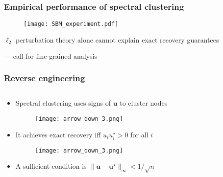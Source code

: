 \documentclass[compress,
mathserif,wide,%
]{beamer}
\begin{document}
\begin{frame}
	\frametitle{Empirical performance of spectral clustering}
	\begin{figure}
	\texttt{[image: SBM\_experiment.pdf]}
	\end{figure}
	
	
	{

\begin{varblock}[\textwidth]{}
\begin{center}
	$\ell_{2}$ perturbation theory alone cannot explain exact recovery guarantees
\end{center}
\end{varblock}
}
\hfill --- call for fine-grained analysis
	\end{frame}
	




\begin{frame}
	\frametitle{Reverse engineering}

\begin{columns}

\begin{column}{0.92\textwidth}
\begin{itemize}
  \item[] Spectral clustering uses signs of $\bm{u}$ to cluster nodes 
  \pause

  \vspace{-1em}
  \begin{figure}
	\texttt{[image: arrow\_down\_3.png]} \qquad 
  \end{figure}

  \item[] It achieves exact recovery iff $u_{i} u_{i}^{\star} > 0$ for all $i$

  \pause
  \vspace{-1em}
  \begin{figure}
	\texttt{[image: arrow\_down\_3.png]} \qquad 
  \end{figure}


  \item[] A sufficient condition is\alertb{$^*$}  $\|\bm{u} - \bm{u}^{\star}\|_{\infty} < 1/\sqrt{n}$

  
\end{itemize}



\end{column}
\end{columns}

\end{frame}
\end{document}
